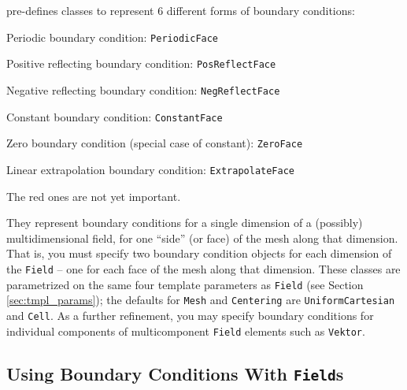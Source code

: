 \ippl pre-defines classes to represent 6 different forms of boundary conditions:
\begin{enumerate}
    \item Periodic boundary condition: \texttt{PeriodicFace}
    \item {\color{red} Positive reflecting boundary condition: \texttt{PosReflectFace}
    \item Negative reflecting boundary condition: \texttt{NegReflectFace}
    \item Constant boundary condition: \texttt{ConstantFace}}
    \item Zero boundary condition (special case of constant): \texttt{ZeroFace}
    \item {\color{red} Linear extrapolation boundary condition: \texttt{ExtrapolateFace}}
\end{enumerate}
The {\color{red} red} ones are not yet important.


They represent boundary conditions for a single dimension of a (possibly) multidimensional field, for one ``side'' (or face) of the mesh along that dimension. That is, you must specify two boundary condition objects for each dimension of the \texttt{Field} -- one for each face of the mesh along that dimension. These classes are parametrized on the same four template parameters as \texttt{Field} (see Section \ref{sec:tmpl_params}); the defaults for \texttt{Mesh} and \texttt{Centering} are
\texttt{UniformCartesian} and \texttt{Cell}. As a
further refinement, you may specify boundary conditions for individual components of multicomponent \texttt{Field} elements such as \texttt{Vektor}.

\subsection{Using Boundary Conditions With \texttt{Field}s}

